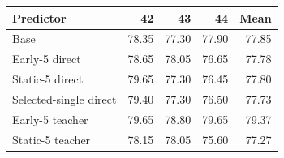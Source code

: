 \begin{tabular}{lrrrr}
\toprule
Predictor & 42 & 43 & 44 & Mean \\
\midrule
Base & 78.35 & 77.30 & 77.90 & 77.85 \\
Early-5 direct & 78.65 & 78.05 & 76.65 & 77.78 \\
Static-5 direct & 79.65 & 77.30 & 76.45 & 77.80 \\
Selected-single direct & 79.40 & 77.30 & 76.50 & 77.73 \\
Early-5 teacher & 79.65 & 78.80 & 79.65 & 79.37 \\
Static-5 teacher & 78.15 & 78.05 & 75.60 & 77.27 \\
\bottomrule
\end{tabular}

